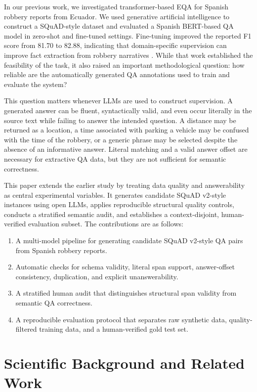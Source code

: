 \documentclass[graybox]{SNmult}
\begin{document}
In our previous work, we investigated transformer-based EQA for Spanish robbery reports from Ecuador. We used generative artificial intelligence to construct a SQuAD-style dataset and evaluated a Spanish BERT-based QA model in zero-shot and fine-tuned settings. Fine-tuning improved the reported F1 score from 81.70 to 82.88, indicating that domain-specific supervision can improve fact extraction from robbery narratives \cite{falconi2026robberyqa}. While that work established the feasibility of the task, it also raised an important methodological question: how reliable are the automatically generated QA annotations used to train and evaluate the system?

This question matters whenever LLMs are used to construct supervision. A generated answer can be fluent, syntactically valid, and even occur literally in the source text while failing to answer the intended question. A distance may be returned as a location, a time associated with parking a vehicle may be confused with the time of the robbery, or a generic phrase may be selected despite the absence of an informative answer. Literal matching and a valid answer offset are necessary for extractive QA data, but they are not sufficient for semantic correctness.

This paper extends the earlier study by treating data quality and answerability as central experimental variables. It generates candidate SQuAD v2-style instances using open LLMs, applies reproducible structural quality controls, conducts a stratified semantic audit, and establishes a context-disjoint, human-verified evaluation subset. The contributions are as follows:
\begin{enumerate}
\item A multi-model pipeline for generating candidate SQuAD v2-style QA pairs from Spanish robbery reports.
\item Automatic checks for schema validity, literal span support, answer-offset consistency, duplication, and explicit unanswerability.
\item A stratified human audit that distinguishes structural span validity from semantic QA correctness.
\item A reproducible evaluation protocol that separates raw synthetic data, quality-filtered training data, and a human-verified gold test set.
\end{enumerate}

\section{Scientific Background and Related Work}
\label{sec:related-work}
\end{document}
